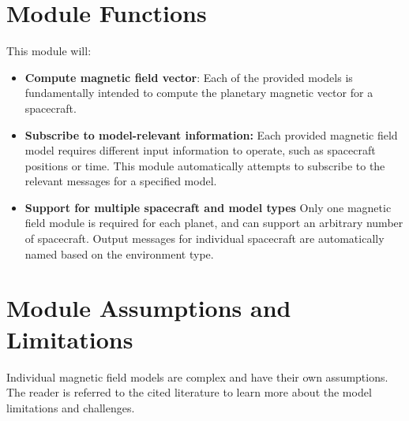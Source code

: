 

\section{Module Functions}
This module will:
\begin{itemize}
	\item \textbf{Compute magnetic field vector}: Each of the provided models is fundamentally intended to compute the planetary magnetic vector  for a spacecraft. 
	\item \textbf {Subscribe to model-relevant information:} Each provided magnetic field model requires different input information to operate, such as spacecraft positions or time. This module automatically attempts to subscribe to the relevant messages for a specified model. 
	\item \textbf{Support for multiple spacecraft and model types} Only one magnetic field module is required for each planet, and can support an arbitrary number of spacecraft. Output messages for individual spacecraft are automatically named based on the environment type.
\end{itemize}

\section{Module Assumptions and Limitations}
Individual magnetic field models are complex and have their own assumptions. The reader is referred to the cited literature to learn more about the model limitations and challenges. 